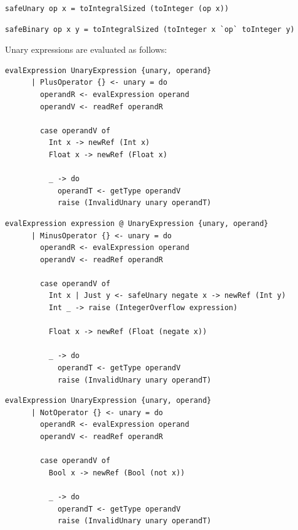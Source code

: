 \documentclass[UdineBachThesis,american,11pt,draft]{PhdThesis}
\begin{document}
  \begin{lstlisting}[gobble=4,basicstyle=\ttfamily\small]
    safeUnary op x = toIntegralSized (toInteger (op x))
  \end{lstlisting}

  \begin{lstlisting}[gobble=4,basicstyle=\ttfamily\small]
    safeBinary op x y = toIntegralSized (toInteger x `op` toInteger y)
  \end{lstlisting}

  Unary expressions are evaluated as follows:

  \begin{lstlisting}[gobble=4,basicstyle=\ttfamily\small]
    evalExpression UnaryExpression {unary, operand}
      | PlusOperator {} <- unary = do
        operandR <- evalExpression operand
        operandV <- readRef operandR

        case operandV of
          Int x -> newRef (Int x)
          Float x -> newRef (Float x)

          _ -> do
            operandT <- getType operandV
            raise (InvalidUnary unary operandT)
  \end{lstlisting}

  \begin{lstlisting}[gobble=4,basicstyle=\ttfamily\small]
    evalExpression expression @ UnaryExpression {unary, operand}
      | MinusOperator {} <- unary = do
        operandR <- evalExpression operand
        operandV <- readRef operandR

        case operandV of
          Int x | Just y <- safeUnary negate x -> newRef (Int y)
          Int _ -> raise (IntegerOverflow expression)

          Float x -> newRef (Float (negate x))

          _ -> do
            operandT <- getType operandV
            raise (InvalidUnary unary operandT)
  \end{lstlisting}

  \begin{lstlisting}[gobble=4,basicstyle=\ttfamily\small]
    evalExpression UnaryExpression {unary, operand}
      | NotOperator {} <- unary = do
        operandR <- evalExpression operand
        operandV <- readRef operandR

        case operandV of
          Bool x -> newRef (Bool (not x))

          _ -> do
            operandT <- getType operandV
            raise (InvalidUnary unary operandT)
  \end{lstlisting}
\end{document}
